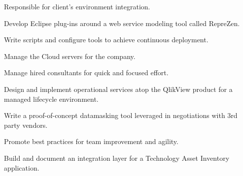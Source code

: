 \documentclass[letterpaper]{deedy-resume} %
\begin{document}
\begin{minipage}[t]{0.66\textwidth}
\sectionspace %



\begin{tightitemize}
\item Responsible for client's environment integration.
\item Develop Eclipse plug-ins around a web service modeling tool called RepreZen.
\item Write scripts and configure tools to achieve continuous deployment.
\item Manage the Cloud servers for the company.
\item Manage hired consultants for quick and focused effort.
\end{tightitemize}

\sectionspace %



\begin{tightitemize}
\item Design and implement operational services atop the QlikView product for a managed lifecycle environment.
\item Write a proof-of-concept datamasking tool leveraged in negotiations with 3rd party vendors.
\item Promote best practices for team improvement and agility.
\item Build and document an integration layer for a Technology Asset Inventory application. 
\end{tightitemize}

\sectionspace %




\sectionspace %



\end{minipage}
\end{document}
